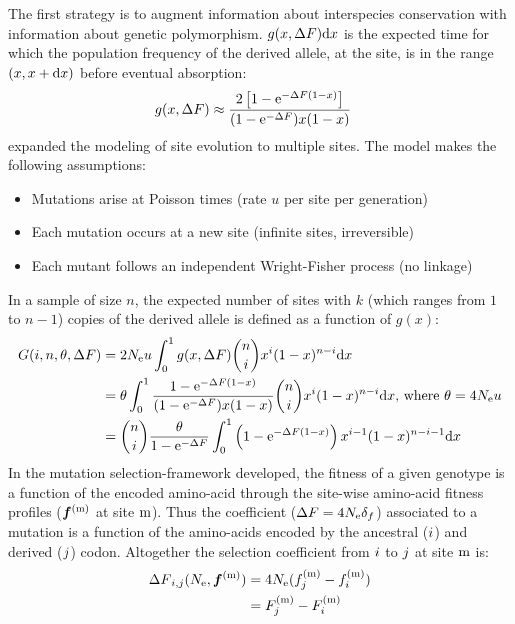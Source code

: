 The first strategy is to augment information about interspecies conservation with information about genetic polymorphism.
$g(x, {\Delta F}) \mathrm{d} x $ is the expected time for which the population frequency of the derived \gls{allele}, at the site, is in the range $(x, x+\mathrm{d} x)$ before eventual absorption:
\begin{align}
	g(x, {\Delta F}) & \approx \dfrac{2 \left[ 1 - \mathrm{e}^{-{\Delta F} (1-x)}\right]}{(1 - \mathrm{e}^{-{\Delta F}})x(1-x)}
\end{align}
\citet{Sawyer1992} expanded the modeling of site evolution to multiple sites.
The model makes the following assumptions:
\begin{itemize}
	\setlength\itemsep{-0.2em}
	\item Mutations arise at Poisson times (rate $u$ per site per generation)
	\item Each mutation occurs at a new site (infinite sites, irreversible)
	\item Each mutant follows an independent Wright-Fisher process (no linkage)
\end{itemize}
In a sample of size $n$, the expected number of sites with $k$ (which ranges from $1$ to $n-1$) copies of the derived \gls{allele} is defined as a function of $g(x)$:
\begin{align}
	G(i, n, \theta, {\Delta F}) & = 2 N_{\textrm{e}} u \int_{0}^{1} g(x, {\Delta F}) \binom{n}{i} x^{i} (1-x)^{n-i} \mathrm{d} x \nonumber \\
	& = \theta \int_{0}^{1} \dfrac{1 - \mathrm{e}^{-{\Delta F} (1-x)}}{(1 - \mathrm{e}^{-{\Delta F}})x(1-x)} \binom{n}{i} x^{i} (1-x)^{n-i} \mathrm{d} x\text{, where } \theta=4N_{\textrm{e}} u \nonumber \\
	& = \binom{n}{i} \dfrac{\theta }{1 - \mathrm{e}^{-{\Delta F}}} \int_{0}^{1} \left( 1 - \mathrm{e}^{-{\Delta F} (1-x)} \right) x^{i-1} (1-x)^{n-i-1} \mathrm{d} x
\end{align}
In the mutation selection-framework developed, the fitness of a given genotype is a function of the encoded amino-acid through the site-wise amino-acid fitness profiles ($ \bm{f}^{(\text{m})} $ at site $\text{m}$). Thus the coefficient (${\Delta F}=4N_{\textrm{e}} {\delta_{f}} $) associated to a mutation is a function of the amino-acids encoded by the ancestral (${i}$) and derived (${j}$) \gls{codon}. Altogether the selection coefficient from ${i}$ to ${j}$ at site $\text{m}$ is:
\begin{align}
	{\Delta F}_{{i}, {j}}(N_{\textrm{e}}, \bm{f}^{(\text{m})}) &= 4 N_{\textrm{e}} (f_{j}^{(\text{m})}-f_{i}^{(\text{m})}) \nonumber \\
	& = F_{j}^{(\text{m})}-F_{i}^{(\text{m})}
\end{align}
